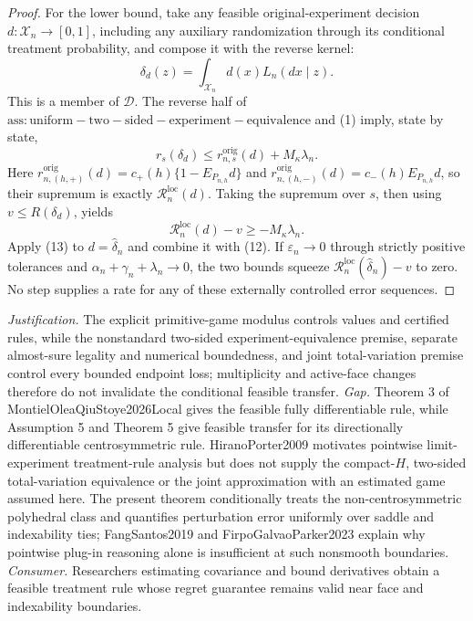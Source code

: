 \documentclass{article}
\begin{document}
\begin{proof}
For the lower bound, take any feasible original-experiment decision \(d:\mathcal X_n\to[0,1]\), including any auxiliary randomization through its conditional treatment probability, and compose it with the reverse kernel:
\[
 \delta_d(z)=\int_{\mathcal X_n}d(x)L_n(dx\mid z).
\]
This is a member of \(\mathcal D\). The reverse half of \(\mathrm{ass:uniform-two-sided-experiment-equivalence}\) and (1) imply, state by state,
\[
 r_s(\delta_d)\leq r^{\mathrm{orig}}_{n,s}(d)+M_{\kappa}\lambda_n.
\]
Here \(r^{\mathrm{orig}}_{n,(h,+)}(d)=c_{+}(h)\{1-E_{P_{n,h}}d\}\) and \(r^{\mathrm{orig}}_{n,(h,-)}(d)=c_{-}(h)E_{P_{n,h}}d\), so their supremum is exactly \(\mathcal R_n^{\mathrm{loc}}(d)\).
Taking the supremum over \(s\), then using \(v\leq R(\delta_d)\), yields
\[
 \mathcal R_n^{\mathrm{loc}}(d)-v\geq-M_{\kappa}\lambda_n. \tag{13}
\]
Apply (13) to \(d=\widehat\delta_n\) and combine it with (12). If \(\varepsilon_n\to0\) through strictly positive tolerances and \(\alpha_n+\gamma_n+\lambda_n\to0\), the two bounds squeeze \(\mathcal R_n^{\mathrm{loc}}(\widehat\delta_n)-v\) to zero. No step supplies a rate for any of these externally controlled error sequences.
\end{proof}
\par\smallskip\noindent \textit{Justification.} The explicit primitive-game modulus controls values and certified rules, while the nonstandard two-sided experiment-equivalence premise, separate almost-sure legality and numerical boundedness, and joint total-variation premise control every bounded endpoint loss; multiplicity and active-face changes therefore do not invalidate the conditional feasible transfer. \textit{Gap.} Theorem 3 of MontielOleaQiuStoye2026Local gives the feasible fully differentiable rule, while Assumption 5 and Theorem 5 give feasible transfer for its directionally differentiable centrosymmetric rule. HiranoPorter2009 motivates pointwise limit-experiment treatment-rule analysis but does not supply the compact-\(H\), two-sided total-variation equivalence or the joint approximation with an estimated game assumed here. The present theorem conditionally treats the non-centrosymmetric polyhedral class and quantifies perturbation error uniformly over saddle and indexability ties; FangSantos2019 and FirpoGalvaoParker2023 explain why pointwise plug-in reasoning alone is insufficient at such nonsmooth boundaries. \textit{Consumer.} Researchers estimating covariance and bound derivatives obtain a feasible treatment rule whose regret guarantee remains valid near face and indexability boundaries.
\end{document}
